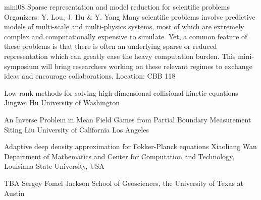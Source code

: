 \mini
{mini08}
{Sparse representation and model reduction for scientific problems}
{Organizers: Y. Lou, J. Hu \& Y. Yang}
{Many scientific problems involve predictive models of multi-scale and multi-physics systems, most of which are extremely complex and computationally expensive to simulate. Yet, a common feature of these problems is that there is often an underlying sparse or reduced representation which can greatly ease the heavy computation burden. This mini-symposium will bring researchers working on these relevant regimes to exchange ideas and encourage collaborations.}
{Location: CBB 118}

\begin{talks}
\item\talk
{Low-rank methods for solving high-dimensional collisional kinetic equations}
{Jingwei Hu}
{University of Washington}
\item\talk
{An Inverse Problem in Mean Field Games from Partial Boundary Measurement}
{Siting Liu}
{University of California Los Angeles}
\item\talk
{Adaptive deep density approximation for Fokker-Planck equations}
{Xiaoliang Wan}
{Department of Mathematics and Center for Computation and Technology, Louisiana State University, USA}
\item\talk
{TBA}
{Sergey Fomel}
{Jackson School of Geosciences, the University of Texas at Austin}
\end{talks}
\room
